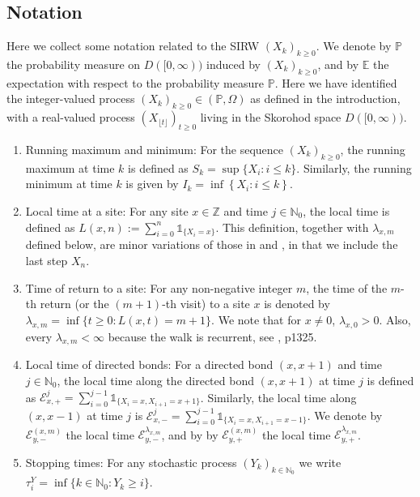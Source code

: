\documentclass[EJP]{ejpecp} %
\begin{document}
\subsection{Notation}


	Here we collect some notation related to the SIRW $(X_k)_{k \ge 0}$.
	We denote by $\mathbb{P}$ the probability measure on $D([0,\infty))$ induced by $(X_k)_{k\geq 0}$, and by $\mathbb{E}$ the expectation with respect to the probability measure $\mathbb{P}$. Here we have identified the integer-valued process $(X_k)_{k \ge 0} \in (\mathbb{P}, \Omega)$ as defined in the introduction, with a real-valued process $(X_{\lfloor t \rfloor})_{t \ge 0}$ living in the Skorohod space $D([0,\infty))$. 
\begin{enumerate}
	\item Running maximum and minimum: For the sequence $(X_k)_{k \ge 0}$, the running maximum at time $k$ is defined as $S_k = \sup\{X_i : i \le k\}$. Similarly, the running minimum at time $k$ is given by $I_k = \inf \left\{X_i: i \le k\right\}$.
	\item
	Local time at a site: For any site $x \in \mathbb{Z}$ and time $j \in \mathbb{N}_0$, the local time is defined as $L(x,n):= \sum_{i=0}^n \mathbb{1}_{\{X_i=x\}}$. 
	This definition, together with $\lambda_{x, m}$ defined below, are minor variations of those in \cite{KMP23} and \cite{KP16}, in that we include the last step $X_n$.
	\item
	Time of return to a site: For any non-negative integer $m$, the time of the $m$-th return (or the $(m+1)$-th visit) to a site $x$ is denoted by $\lambda_{x,m} = \inf\{t \geq 0: L(x,t) = m+1\}$. 
	We note that for $x\neq 0$, $\lambda_{x,0} > 0$. Also, every $\lambda_{x,m}<\infty$ because the walk is recurrent, see \cite{T96}, p1325.
	\item
	Local time of directed bonds: For a directed bond $(x,x+1)$ and time $j \in \mathbb{N}_0$, the local time along the directed bond $(x, x+1)$ at time $j$ is defined as $\mathcal{E}^j_{x,+} = \sum_{i=0}^{j-1} \mathbb{1}_{\{X_i=x, X_{i+1} =x+1\}}$. 
	Similarly, the local time along $(x,x-1)$ at time $j$ is $\mathcal{E}^j_{x,-} = \sum_{i=0}^{j-1} \mathbb{1}_{\{X_i=x, X_{i+1} =x-1\}}$.
	We denote by $\mathcal{E}^{(x,m)}_{y, -}$ the local time $\mathcal{E}^{\lambda_{x,m}}_{y,-}$, and by by $\mathcal{E}^{(x,m)}_{y, +}$ the local time $\mathcal{E}^{\lambda_{x,m}}_{y,+}$.
	\item
	Stopping times: For any stochastic process $(Y_k)_{k \in \mathbb{N}_0}$ we write $\tau^Y_{i} = \inf \{k \in  \mathbb{N}_0: Y_k \ge  i\}$.
\end{enumerate}
\end{document}
